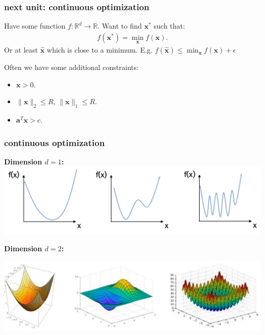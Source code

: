 \documentclass[compress]{beamer}
\newcommand{\bv}[1]{\mathbf{#1}}
\newcommand{\R}{\mathbb{R}}
\begin{document}
\begin{frame}
	\frametitle{next unit: continuous optimization}
	Have some function $f : \R^d \rightarrow \R$. Want to find ${\bv{x}}^*$ such that:
	\begin{align*}
		f({\bv{x}}^*) = \min_{\bv{x}} f(\bv{x}).
	\end{align*}
	Or at least $\hat{\bv{x}}$ which is close to a minimum. E.g. $f(\hat{\bv{x}}) \leq \min_{\bv{x}} f(\bv{x}) + \epsilon$
	
	Often we have some additional constraints:
	\begin{itemize}
		\item $\bv{x} > 0$.
		\item $\|\bv{x}\|_2 \leq R$, $\|\bv{x}\|_1 \leq R$.
		\item $\bv{a}^T\bv{x} > c$.
	\end{itemize}
\end{frame}

\begin{frame}
	\frametitle{continuous optimization}
	\textbf{Dimension $d = 1$:}
	\includegraphics[width=\textwidth]{1d_functions.png}
	
	\textbf{Dimension $d = 2$:}
	
	\includegraphics[width=\textwidth]{2dfunctions.png}
\end{frame}
\end{document}
